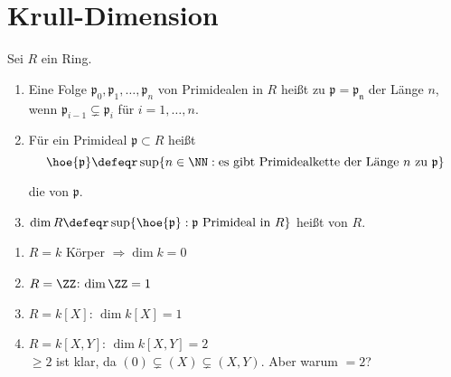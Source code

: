\section{Krull-Dimension}

\begin{Def}
\label{2.24}
Sei $R$ ein Ring. 
\begin{enumerate}

\item Eine Folge $\mathfrak{p}_0, \mathfrak{p}_1, \dots ,\mathfrak{p}_n$
von Primidealen in $R$ hei\ss t  zu $\mathfrak{p}=\mathfrak{p_n}$
der L\"ange $n$, wenn $\mathfrak{p}_{i-1}\subsetneq \mathfrak{p}_i$ f\"ur $i=1,\ldots, n$.

\item F\"ur ein Primideal $\mathfrak{p}\subset R$ hei\ss t
$$ \hoe{\mathfrak{p}}\defeqr\sup\{n\in\NN:
\text{es gibt Primidealkette der L\"ange}\ n\ \text{zu}\ \mathfrak{p}\} $$

die 
von $\mathfrak{p}$.

\item $\dim{R} \defeqr\sup\{\hoe{\mathfrak{p}}:\mathfrak{p}
\text{ Primideal in }R\}$
hei\ss t  von $R$.

\end{enumerate}
\end{Def}


\begin{nnBsp}
\begin{enumerate}
\item $R=k$ K\"orper $\Rightarrow \dim{k}=0$
\item $R=\ZZ$: $\dim{\ZZ}=1$
\item $R=k[X]$: $\dim{k[X]} =1$
\item $R=k[X,Y]$: $\dim{k[X,Y]} =2$\\
$\geq 2$ ist klar, da $(0)\subsetneq(X)\subsetneq(X,Y)$. Aber warum $=2$?
\end{enumerate}
\end{nnBsp}

